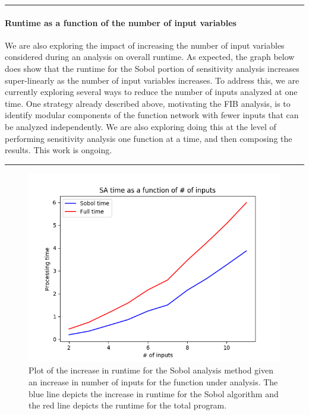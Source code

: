 \documentclass[article, 12pt, oneside]{memoir}
\begin{document}
\begin{center}\rule{0.5\linewidth}{\linethickness}\end{center}

\hypertarget{runtime-as-a-function-of-the-number-of-input-variables}{%
\paragraph{Runtime as a function of the number of input
variables}\label{runtime-as-a-function-of-the-number-of-input-variables}}

We are also exploring the impact of increasing the number of input
variables considered during an analysis on overall runtime. As expected,
the graph below does show that the runtime for the Sobol portion of
sensitivity analysis increases super-linearly as the number of input
variables increases. To address this, we are currently exploring several
ways to reduce the number of inputs analyzed at one time. One strategy
already described above, motivating the FIB analysis, is to identify
modular components of the function network with fewer inputs that can be
analyzed independently. We are also exploring doing this at the level of
performing sensitivity analysis one function at a time, and then
composing the results. This work is ongoing.

\begin{center}\rule{0.5\linewidth}{\linethickness}\end{center}

\begin{figure}
\centering
\includegraphics{figs/sa_inputs_vs_runtime.png}
\caption{Plot of the increase in runtime for the Sobol analysis method
given an increase in number of inputs for the function under analysis.
The blue line depicts the increase in runtime for the Sobol algorithm
and the red line depicts the runtime for the total program.}
\end{figure}
\end{document}
